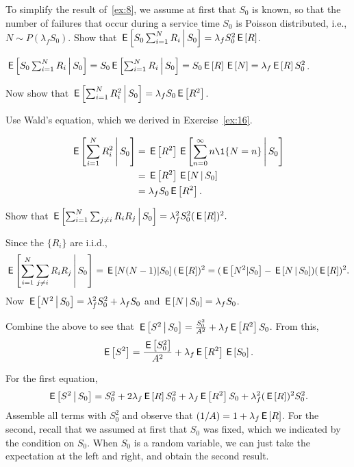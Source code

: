 \begin{extra}
  To simplify the result of~\cref{ex:8}, we assume at first that $S_0$ is known, so that the number of failures that occur during a service time $S_0$ is Poisson distributed, i.e., $N\sim P(\lambda_f S_0)$.
  Show that $\,\mathsf{E}\left[S_0 \sum_{i=1}^N R_i\,\middle|\, S_0\right] = \lambda_f S_0^2 \,\mathsf{E}\left[R\right]$.
\begin{solution}
$\,\mathsf{E}\left[S_0 \sum_{i=1}^N R_i\,\middle|\, S_0\right] = 
S_0 \,\mathsf{E}\left[\sum_{i=1}^N R_i\,\middle|\, S_0\right] = S_0 \,\mathsf{E}\left[R\right] \,\mathsf{E}\left[N\right] = \lambda_f \,\mathsf{E}\left[R\right] S_0^2$.
\end{solution}
\end{extra}

\begin{extra} Now show that $\,\mathsf{E}\left[\sum_{i=1}^N R_i^2\,\middle|\, S_0\right] = \lambda_f S_0 \,\mathsf{E}\left[R^2\right]$.
\begin{hint}
  Use Wald's equation, which we derived in Exercise~\ref{ex:16}.
\end{hint}
\begin{solution}
  \begin{align*}
    \E{\sum_{i=1}^N R_i^2\given S_0} 
&= \E{R^2}\E{ \sum_{n=0}^\infty n \1{N=n}\given S_0}\\
&= \E{R^2} \E{N\given S_0} \\
&= \lambda_f S_0 \E{R^2}.
  \end{align*}
\end{solution}
\end{extra}

\begin{extra}
Show that 
$\,\mathsf{E}\left[\sum_{i=1}^N \sum_{j\neq i} R_i R_j\,\middle|\, S_0\right] = \lambda_f^2 S_0^2 (\,\mathsf{E}\left[R\right])^2.$
\begin{solution}
Since the $\{R_i\}$ are i.i.d., 
  \begin{equation*}
\,\mathsf{E}\left[\sum_{i=1}^N \sum_{j\neq i} R_i R_j\,\middle|\, S_0\right]
= \,\mathsf{E}\left[N(N-1)|S_0\right] (\,\mathsf{E}\left[R\right])^2 
= (\,\mathsf{E}\left[N^2|S_0\right]-\,\mathsf{E}\left[N\,\middle|\, S_0\right]) (\,\mathsf{E}\left[R\right])^2.
  \end{equation*}
Now $\,\mathsf{E}\left[N^2\,\middle|\, S_0\right]=\lambda_f^2 S_0^2 +\lambda_f S_0$ and $\,\mathsf{E}\left[N\,\middle|\, S_0\right] = \lambda_f S_0$.
\end{solution}
\end{extra}

\begin{extra}\label{ex:82}
  Combine the above to see that
    $\,\mathsf{E}\left[S^2\,\middle|\, S_0\right] = \frac{S_0^2}{A^2} + \lambda_f \,\mathsf{E}\left[R^2\right] S_0$. From this, 
  \begin{equation*}
    \,\mathsf{E}\left[S^2\right] = \frac{\,\mathsf{E}\left[S_0^2\right]}{A^2} + \lambda_f \,\mathsf{E}\left[R^2\right] \,\mathsf{E}\left[S_0\right].
  \end{equation*}
  \begin{solution}
For the first equation,
\begin{equation*}
  \,\mathsf{E}\left[S^2\,\middle|\, S_0\right] = S_0^2 + 2\lambda_f \,\mathsf{E}\left[R\right] S_0^2 + \lambda_f \,\mathsf{E}\left[R^2\right] S_0 + \lambda_f^2 (\,\mathsf{E}\left[R\right])^2 S_0^2.
\end{equation*}
Assemble all terms with $S_0^2$ and observe that $(1/A) = 1+\lambda_f \,\mathsf{E}\left[R\right]$. For the second, recall that we assumed at first that $S_0$ was fixed, which we indicated by the condition on $S_0$. When $S_0$ is a random variable, we can just take the expectation at the left and right, and obtain the second result. 
  \end{solution}
\end{extra}

